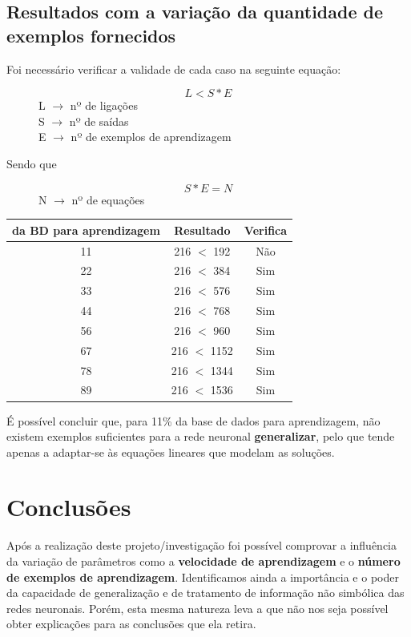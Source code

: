 \documentclass[10pt,a4paper]{article}
\begin{document}
\subsection{Resultados com a variação da quantidade de exemplos fornecidos}

Foi necessário verificar a validade de cada caso na seguinte equação:

\begin{figure}[here]
\centering
\[L<S*E\]
L $\rightarrow$ nº de ligações \\ S $\rightarrow$ nº de saídas \\ E $\rightarrow$ nº de exemplos de aprendizagem
\end{figure}

Sendo que 
\begin{figure}[here]
\centering
\[S*E = N\]
N $\rightarrow$ nº de equações
\end{figure}


\begin{tabular}{|c|c|c|}
\hline 
da BD para aprendizagem & Resultado & Verifica \\ 
\hline 
11 & 216 $<$ 192 & Não \\ 
22 & 216 $<$ 384 & Sim \\ 
33 & 216 $<$ 576 & Sim \\ 
44 & 216 $<$ 768 & Sim \\ 
56 & 216 $<$ 960 & Sim \\ 
67 & 216 $<$ 1152 & Sim \\ 
78 & 216 $<$ 1344 & Sim \\ 
89 & 216 $<$ 1536 & Sim \\ 
\hline
\end{tabular} 

É possível concluir que, para 11\% da base de dados para aprendizagem, não existem exemplos suficientes para a rede neuronal \textbf{generalizar}, pelo que tende apenas a adaptar-se às equações lineares que modelam as soluções.


\section{Conclusões}

Após a realização deste projeto/investigação foi possível comprovar a influência da variação de parâmetros como a \textbf{velocidade de aprendizagem} e o \textbf{número de exemplos de aprendizagem}. Identificamos ainda a importância e o poder da capacidade de generalização e de tratamento de informação não simbólica das redes neuronais. Porém, esta mesma natureza leva a que não nos seja possível obter explicações para as conclusões que ela retira.
\end{document}
